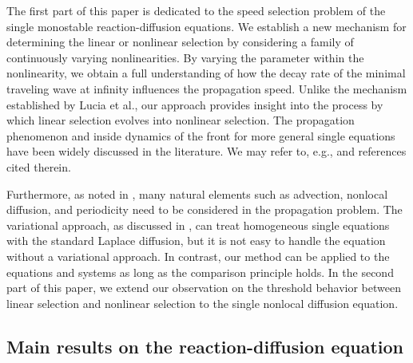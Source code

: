 \documentclass[11pt,a4paper]{article}
\numberwithin{equation}{section}
\numberwithin{figure}{section}
\newcommand{\red}[1]{{\color{red}#1}}
\begin{document}
The first part of this paper is dedicated to the speed selection problem of the single monostable reaction-diffusion equations. 
We establish a new mechanism for determining the linear or nonlinear selection by considering a family of continuously varying nonlinearities.
By varying the parameter within the nonlinearity, we obtain a full understanding of how the decay rate of the minimal traveling wave
at infinity influences the propagation speed.
Unlike the mechanism established by Lucia et al., our approach provides insight into the process by which linear selection evolves into nonlinear selection.
The propagation phenomenon and inside dynamics
of the front for more general single equations have been widely discussed in the literature.
We may refer to, e.g., \cite{Berestycki Hamel2012, Fife McLeod1977, Gardner et al 2012, Liang Zhao 2007, Roques et al 2012, Rothe1981, Stokes1976} and references cited therein.



Furthermore,
as noted in \cite{van Saarloos2003}, many natural elements such as
advection, nonlocal diffusion, and periodicity need to be considered in the propagation problem.  The variational approach, %
as discussed in \cite{Lucia Muratov Novaga}, can %
treat homogeneous single equations with the standard Laplace diffusion, 
but it is not easy to handle the equation without a variational approach.
In contrast, our method can be applied to the equations and systems as long as the comparison principle holds.
In the second part of this paper, we extend our observation on the threshold behavior between linear selection and nonlinear selection to the single nonlocal diffusion equation.




\subsection{Main results on the reaction-diffusion equation}

\noindent
\end{document}
